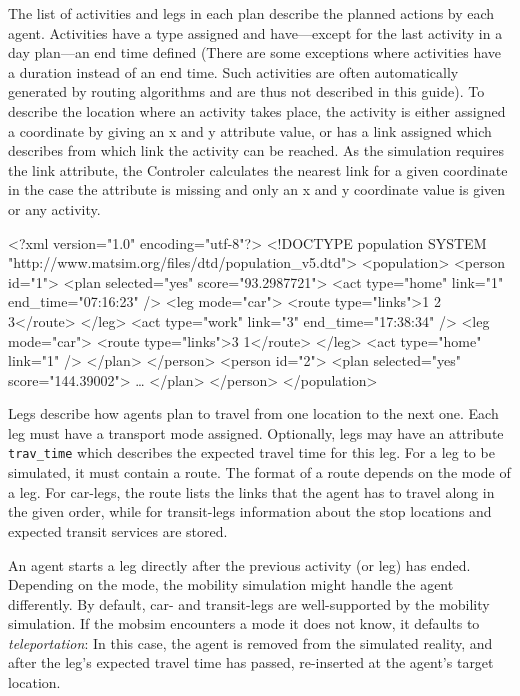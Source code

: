 The list of activities and legs in each plan describe the planned actions by
each agent. Activities have a type assigned and have---except for the last
activity in a day plan---an end time defined (There are some exceptions where
activities have a duration instead of an end time. Such activities are often
automatically generated by routing algorithms and are thus not described in
this guide). To describe the location where an activity takes place, the
activity is either assigned a coordinate by giving an x and y attribute value,
or has a link assigned which describes from which link the activity can be
reached. As the simulation requires the link attribute, the Controler calculates
the nearest link for a given coordinate in the case the attribute is missing and
only an x and y coordinate value is given or any activity.

\begin{xml-file}[caption=An example of a population.xml,
label=lst:BuildingScenarios:populationXml]
<?xml version="1.0" encoding="utf-8"?>
<!DOCTYPE population SYSTEM "http://www.matsim.org/files/dtd/population_v5.dtd">
<population>
	<person id="1">
		<plan selected="yes" score="93.2987721">
			<act type="home" link="1" end_time="07:16:23" />
			<leg mode="car">
				<route type="links">1 2 3</route>
			</leg>
			<act type="work" link="3" end_time="17:38:34" />
			<leg mode="car">
				<route type="links">3 1</route>
			</leg>
			<act type="home" link="1" />
		</plan>
	</person>
	<person id="2">
		<plan selected="yes" score="144.39002">
			\ldots
		</plan>
	</person>
</population>
\end{xml-file}

Legs describe how agents plan to travel from one location to the next one. Each
leg must have a transport mode assigned. Optionally, legs may have an
attribute {\tt trav\_time} which describes the expected travel time for this
leg. For a leg to be simulated, it must contain a route. The format of a
route depends on the mode of a leg. For car-legs, the route lists the links that
the agent has to travel along in the given order, while for transit-legs
information about the stop locations and expected transit services are stored.

An agent starts a leg directly after the previous activity (or leg) has ended.
Depending on the mode, the mobility simulation might handle the agent
differently. By default, car- and transit-legs are well-supported by the
mobility simulation. If the mobsim encounters a mode it does not know, it
defaults to \emph{teleportation}: In this case, the agent is removed from the
simulated reality, and after the leg's expected travel time has passed,
re-inserted at the agent's target location.

